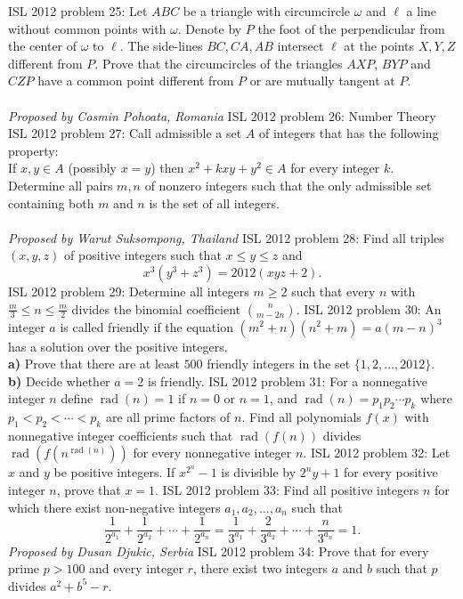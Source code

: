 ISL 2012 problem 25:  Let $ABC$ be a triangle with circumcircle $\omega$ and $\ell$ a line without common points with $\omega$. Denote by $P$ the foot of the perpendicular from the center of $\omega$ to $\ell$. The side-lines $BC,CA,AB$ intersect $\ell$ at the points $X,Y,Z$ different from $P$. Prove that the circumcircles of the triangles $AXP$, $BYP$ and $CZP$ have a common point different from $P$ or are mutually tangent at $P$. \\\\
\textit{Proposed by Cosmin Pohoata, Romania} 
ISL 2012 problem 26:  Number Theory 
ISL 2012 problem 27:  Call admissible a set $A$ of integers that has the following property: \\
If $x,y \in A$ (possibly $x=y$) then $x^2+kxy+y^2 \in A$ for every integer $k$. \\
Determine all pairs $m,n$ of nonzero integers such that the only admissible set containing both $m$ and $n$ is the set of all integers. \\\\
\textit{Proposed by Warut Suksompong, Thailand} 
ISL 2012 problem 28:  Find all triples $(x,y,z)$ of positive integers such that $x \leq y \leq z$ and
\[ x^3(y^3+z^3)=2012(xyz+2). \] 
ISL 2012 problem 29:  Determine all integers $m \geq 2$ such that every $n$ with $\frac{m}{3} \leq n \leq \frac{m}{2}$ divides the binomial coefficient $\binom{n}{m-2n}$. 
ISL 2012 problem 30:  An integer $a$ is called friendly if the equation $(m^2+n)(n^2+m)=a(m-n)^3$ has a solution over the positive integers. \\
\textbf{a)} Prove that there are at least $500$ friendly integers in the set $\{ 1,2,\ldots ,2012\}$. \\
\textbf{b)} Decide whether $a=2$ is friendly. 
ISL 2012 problem 31:  For a nonnegative integer $n$ define $\operatorname{rad}(n)=1$ if $n=0$ or $n=1$, and $\operatorname{rad}(n)=p_1p_2\cdots p_k$ where $p_1<p_2<\cdots <p_k$ are all prime factors of $n$. Find all polynomials $f(x)$ with nonnegative integer coefficients such that $\operatorname{rad}(f(n))$ divides $\operatorname{rad}(f(n^{\operatorname{rad}(n)}))$ for every nonnegative integer $n$. 
ISL 2012 problem 32:  Let $x$ and $y$ be positive integers. If ${x^{2^n}}-1$ is divisible by $2^ny+1$ for every positive integer $n$, prove that $x=1$. 
ISL 2012 problem 33:  Find all positive integers $n$ for which there exist non-negative integers $a_1, a_2, \ldots, a_n$ such that
\[
\frac{1}{2^{a_1}} + \frac{1}{2^{a_2}} + \cdots + \frac{1}{2^{a_n}} = 
\frac{1}{3^{a_1}} + \frac{2}{3^{a_2}} + \cdots + \frac{n}{3^{a_n}} = 1.
\]
\textit{Proposed by Dusan Djukic, Serbia} 
ISL 2012 problem 34:  Prove that for every prime $p>100$ and every integer $r$, there exist two integers $a$ and $b$ such that $p$ divides $a^2+b^5-r$. 

